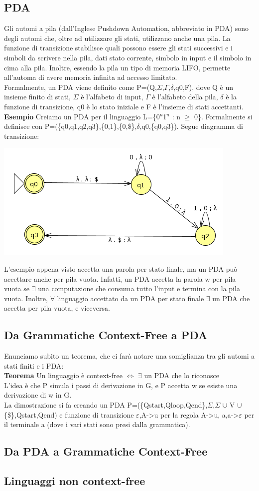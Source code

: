 \documentclass[]{article}
\begin{document}
		\subsection{PDA}
			Gli automi a pila (dall'Inglese Pushdown Automation, abbreviato in PDA) sono degli automi che, oltre ad utilizzare gli stati, utilizzano anche una pila. La funzione di transizione stabilisce quali possono essere gli stati successivi e i simboli da scrivere nella pila, dati stato corrente, simbolo in input e il simbolo in cima alla pila. Inoltre, essendo la pila un tipo di memoria LIFO, permette all'automa di avere memoria infinita ad accesso limitato.\\
			Formalmente, un PDA viene definito come P=(Q,$\Sigma$,$\Gamma$,$\delta$,q0,F), dove Q è un insieme finito di stati, $\Sigma$ è l'alfabeto di input, $\Gamma$ è l'alfabeto della pila, $\delta$ è la funzione di transizione, q0 è lo stato iniziale e F è l'insieme di stati accettanti.\\
			\textbf{Esempio} Creiamo un PDA per il linguaggio L=\{0$^n$1$^n$ : n $\geq$ 0\}. Formalmente si definisce con P=(\{q0,q1,q2,q3\},\{0,1\},\{0,\$\},$\delta$,q0,\{q0,q3\}). Segue diagramma di transizione:
			\begin{center}
				\includegraphics{PDA1.png}
			\end{center}
			L'esempio appena visto accetta una parola per stato finale, ma un PDA può accettare anche per pila vuota. Infatti, un PDA accetta la parola w per pila vuota se $\exists$ una computazione che consuma tutto l'input e termina con la pila vuota. Inoltre, $\forall$ linguaggio accettato da un PDA per stato finale $\exists$ un PDA che accetta per pila vuota, e viceversa.
		\subsection{Da Grammatiche Context-Free a PDA}
			Enunciamo subito un teorema, che ci farà notare una somiglianza tra gli automi a stati finiti e i PDA:\\
			\textbf{Teorema} Un linguaggio è context-free $\Leftrightarrow$ $\exists$ un PDA che lo riconosce\\
			L'idea è che P simula i passi di derivazione in G, e P accetta w se esiste una derivazione di w in G.\\
			La dimostrazione si fa creando un PDA P=(\{Qstart,Qloop,Qend\},$\Sigma$,$\Sigma$ $\cup$ V $\cup$ \{\$\},Qstart,{Qend}) e funzione di transizione $\varepsilon$,A-\textgreater u per la regola A-\textgreater u, a,a-\textgreater $\varepsilon$ per il terminale a (dove i vari stati sono presi dalla grammatica).
		\subsection{Da PDA a Grammatiche Context-Free}
		\subsection{Linguaggi non context-free}
\end{document}
